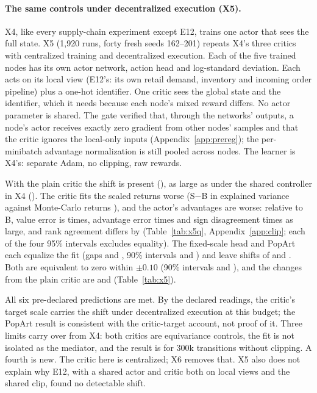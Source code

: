 

\paragraph{The same controls under decentralized execution (X5).}
X4, like every supply-chain experiment except E12, trains one actor that sees the full state. X5 (1,920 runs, forty
fresh seeds 162--201) repeats X4's three critics with centralized training and decentralized execution. Each of the
five trained nodes has its own actor network, action head and log-standard deviation. Each acts on its local view
(E12's: its own retail demand, inventory and incoming order pipeline) plus a one-hot identifier. One critic sees the
global state and the identifier, which it needs because each node's mixed reward differs. No actor parameter is shared.
The gate verified that, through the networks' outputs, a node's actor receives exactly zero gradient from other nodes'
samples and that the critic ignores the local-only inputs (Appendix~\ref{app:prereg}); the per-minibatch advantage
normalization is still pooled across nodes. The learner is X4's: separate Adam, no clipping, raw
rewards.

With the plain critic the shift is present (\VxvPlain{}), as large as under the shared controller in X4
(\VxfPlain{}). The critic fits the scaled returns worse (S$-$B in explained variance against Monte-Carlo returns
\VxvFitPlain{}), and the actor's advantages are worse: relative to B, value error is \VxvVerr{} times, advantage error \VxvGae{} times
and sign disagreement \VxvSign{} times as large, and rank agreement differs by \VxvRank{} (Table~\ref{tab:x5q}, Appendix~\ref{app:clip}; each of
the four 95\% intervals excludes equality). The
fixed-scale head and PopArt each equalize the fit (gaps \VxvFitHead{} and \VxvFitPop{}, 90\% intervals
\VxvFitHeadNinety{} and \VxvFitPopNinety{}) and leave shifts of \VxvHead{} and \VxvPop{}. Both are equivalent to zero
within $\pm0.10$ (90\% intervals \VxvHeadNinety{} and \VxvPopNinety{}), and the changes from the plain critic are
\VxvChHead{} and \VxvChPop{} (Table~\ref{tab:x5}).

All six pre-declared predictions are met. By the declared readings, the critic's target scale carries the shift under
decentralized execution at this budget; the PopArt result is consistent with the critic-target account, not proof
of it. Three limits carry over from X4: both critics are equivariance controls, the fit is not isolated as the mediator, and the
result is for 300k transitions without clipping. A fourth is new. The critic here is centralized; X6 removes that. X5 also does not explain why E12, with a shared
actor and critic both on local views and the shared clip, found no detectable shift.

